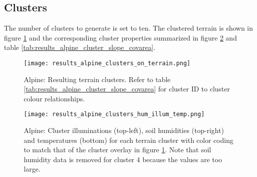 \subsection{Clusters}

The number of clusters to generate is set to ten. The clustered terrain is shown in figure \ref{fig:results_alpine_terrain_clusters} and the corresponding cluster properties summarized in figure \ref{fig:results_alpine_cluster_hum_temp_illum} and table \ref{tab:results_alpine_cluster_slope_covarea}. 

\begin{figure}
\center
	\texttt{[image: results\_alpine\_clusters\_on\_terrain.png]}
	\caption{ Alpine: Resulting terrain clusters. Refer to table \ref{tab:results_alpine_cluster_slope_covarea} for cluster ID to cluster colour relationships.}
	\label{fig:results_alpine_terrain_clusters}
\end{figure}

\begin{figure}
\center
	\texttt{[image: results\_alpine\_clusters\_hum\_illum\_temp.png]}
	\caption{ Alpine: Cluster illuminations (top-left), soil humidities (top-right) and temperatures (bottom) for each terrain cluster with color coding to match that of the cluster overlay in figure \ref{fig:results_alpine_terrain_clusters}. Note that soil humidity data is removed for cluster 4 because the values are too large.}
	\label{fig:results_alpine_cluster_hum_temp_illum}
\end{figure}


